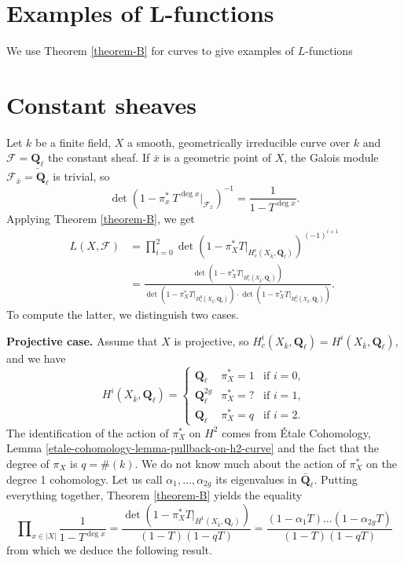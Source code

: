 \section{Examples of L-functions}
\label{section-examples-L-functions}

\noindent
We use Theorem \ref{theorem-B} for curves to give examples of $L$-functions





\section{Constant sheaves}
\label{section-L-function-constant-sheaf}

\noindent
Let $k$ be a finite field, $X$ a smooth, geometrically irreducible curve over
$k$ and $\mathcal{F} = \underline{\mathbf{Q}_\ell}$ the constant sheaf. If
$\bar x$ is a geometric point of $X$, the Galois module
$\mathcal{F}_{\bar x} = \mathbf{Q}_\ell$ is trivial, so
$$
\det(1-\pi_x^*\ T^{\deg x} |_{\mathcal{F}_{\bar x}})^{-1} =
\frac{1}{1-T^{\deg x}}.
$$
Applying Theorem \ref{theorem-B}, we get
\begin{align*}
L(X, \mathcal{F})
& =
\prod_{i = 0}^2
\det(1 - \pi_X^*T |_{H_c^i(X_{\bar k}, \mathbf{Q}_\ell)})^{(-1)^{i+1}} \\
& =
\frac{\det(1 - \pi_X^*T |_{H_c^1(X_{\bar k}, \mathbf{Q}_\ell)})}{
\det(1 - \pi_X^*T |_{H_c^0(X_{\bar k}, \mathbf{Q}_\ell)})
\cdot \det(1 - \pi_X^*T |_{H_c^2(X_{\bar k}, \mathbf{Q}_\ell)})}.
\end{align*}
To compute the latter, we distinguish two cases.


\medskip\noindent
{\bf Projective case.}
Assume that $X$ is projective, so $H_c^i(X_{\bar k}, \mathbf{Q}_\ell) =
H^i(X_{\bar k}, \mathbf{Q}_\ell)$, and we have
$$
H^i(X_{\bar k}, \mathbf{Q}_\ell) =
\left\{
\begin{matrix}
\mathbf{Q}_\ell & \pi_X^* = 1 & \text{if }i = 0, \\
\mathbf{Q}_\ell^{2g} & \pi_X^* = ? & \text{if }i = 1, \\
\mathbf{Q}_\ell & \pi_X^* = q & \text{if }i = 2.
\end{matrix}
\right.
$$
The identification of the action of $\pi_X^*$ on $H^2$ comes from
\'Etale Cohomology, Lemma \ref{etale-cohomology-lemma-pullback-on-h2-curve}
and the fact that the degree
of $\pi_X$ is $q = \#(k)$.
We do not know much about the action of $\pi_X^*$ on the degree 1 cohomology.
Let us call $\alpha_1, \ldots, \alpha_{2g}$ its eigenvalues in
$\bar{\mathbf{Q}}_\ell$. Putting everything together,
Theorem \ref{theorem-B}
yields the equality
$$
\prod\nolimits_{x \in |X|} \frac{1}{1 - T^{\deg x}} =
\frac{\det(1- \pi_X^* T|_{H^1(X_{\bar k}, \mathbf{Q}_\ell)})}{(1-T)(1-qT)} =
\frac{(1 - \alpha_1 T) \ldots (1 - \alpha_{2g}T)}{(1-T)(1-qT)}
$$
from which we deduce the following result.

